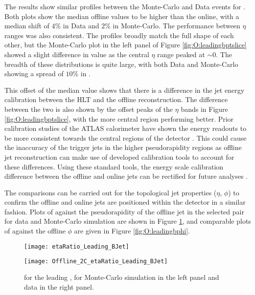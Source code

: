 		\newpage
		The results show similar profiles between the Monte-Carlo and Data events for \dptpt. Both plots show the median offline \pt values to be higher than the online, with a median shift of $4\%$ in Data and $2\%$ in Monte-Carlo. The performance between $\eta$ ranges was also consistent. The profiles broadly match the full shape of each other, but the Monte-Carlo plot in the left panel of Figure \ref{fig:O:leadingbptslice} showed a slight difference in \dptpt value as the central $\eta$ range peaked at $\sim0$. The breadth of these distributions is quite large, with both Data and Monte-Carlo showing a spread of $10\%$ in \dptpt.

		This offset of the median \dptpt value shows that there is a difference in the jet energy calibration between the HLT and the offline reconstruction. The difference between the two is also shown by the offset peaks of the $\eta$ bands in Figure \ref{fig:O:leadingbptslice}, with the more central region performing better. Prior calibration studies of the ATLAS calorimeter have shown the energy readouts to be more consistent towards the central regions of the detector \cite{JES}. This could cause the inaccuracy of the trigger jets in the higher pseudorapidity regions as offline jet reconstruction can make use of developed calibration tools to account for these differences. Using these standard tools, the energy scale calibration difference between the offline and online jets can be rectified for future analyses \cite{jetcalib, JES}.

		The \dxx comparisons can be carried out for the topological jet properties ($\eta$, $\phi$) to confirm the offline and online jets are positioned within the detector in a similar fashion. Plots of \dee against the pseudorapidity of the offline jet in the selected pair for data and Monte-Carlo simulation are shown in Figure \ref{fig:O:leadingbeta}, and comparable plots of \dphph against the offline $\phi$ are given in Figure \ref{fig:O:leadingbphi}.

		\begin{figure}[h]
			\centering
			\begin{minipage}[h]{0.48\linewidth}
				\texttt{[image: etaRatio\_Leading\_BJet]}

			\end{minipage}
			\quad
			\begin{minipage}[h]{0.48\linewidth}
				\texttt{[image: Offline\_2C\_etaRatio\_Leading\_BJet]}
			\end{minipage}
			\caption{\dee for the leading \bjet, for Monte-Carlo simulation in the left panel and data in the right panel.}
			\label{fig:O:leadingbeta}
		\end{figure}

